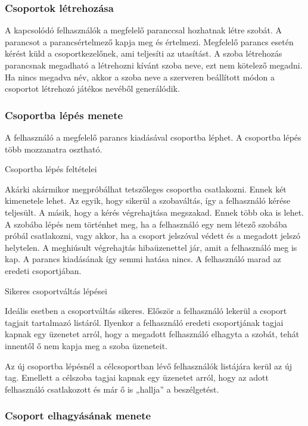 \documentclass[]{article}
\begin{document}
\subsubsection{Csoportok
létrehozása}

A kapcsolódó felhasználók a megfelelő paranccsal hozhatnak létre szobát.
A parancsot a parancsértelmező kapja meg és értelmezi. Megfelelő parancs
esetén kérést küld a csoportkezelőnek, ami teljesíti az utasítást. A
szoba létrehozás parancsnak megadható a létrehozni kívánt szoba neve,
ezt nem kötelező megadni. Ha nincs megadva név, akkor a szoba neve a
szerveren beállított módon a csoportot létrehozó játékos nevéből
generálódik.


\subsubsection{Csoportba lépés
menete}

A felhasználó a megfelelő parancs kiadásával csoportba léphet. A
csoportba lépés több mozzanatra osztható.

Csoportba lépés feltételei

Akárki akármikor megpróbálhat tetszőleges csoportba csatlakozni. Ennek
két kimenetele lehet. Az egyik, hogy sikerül a szobaváltás, így a
felhasználó kérése teljesült. A másik, hogy a kérés végrehajtása
megszakad. Ennek több oka is lehet. A szobába lépés nem történhet meg,
ha a felhasználó egy nem létező szobába próbál csatlakozni, vagy akkor,
ha a csoport jelszóval védett és a megadott jelszó helytelen. A
meghiúsult végrehajtás hibaüzenettel jár, amit a felhasználó meg is kap.
A parancs kiadásának így semmi hatása nincs. A felhasználó marad az
eredeti csoportjában.

Sikeres csoportváltás lépései

Ideális esetben a csoportváltás sikeres. Először a felhasználó lekerül a
csoport tagjait tartalmazó listáról. Ilyenkor a felhasználó eredeti
csoportjának tagjai kapnak egy üzenetet arról, hogy a megadott
felhasználó elhagyta a szobát, tehát innentől ő nem kapja meg a szoba
üzeneteit.

Az új csoportba lépésnél a célcsoportban lévő felhasználók listájára
kerül az új tag. Emellett a célszoba tagjai kapnak egy üzenetet arról,
hogy az adott felhasználó csatlakozott és már ő is „hallja'' a
beszélgetést.


\subsubsection{Csoport elhagyásának
menete}
\end{document}

